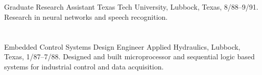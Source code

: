 \documentclass[11pt]{resume}
\begin{document}
 \section{}
  {Graduate Research Assistant}
   {Texas Tech University, Lubbock, Texas,  8/88--9/91. Research
  in neural networks and speech recognition.}

   
\section{}{Embedded Control Systems Design Engineer} {Applied
  Hydraulics, Lubbock, Texas, 1/87--7/88.  Designed and built
  microprocessor and sequential logic based systems for industrial control
  and data acquisition. }
\end{document}
